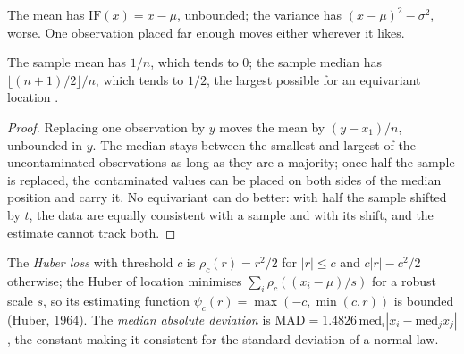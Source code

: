The mean has $\mathrm{IF}(x) = x - \mu$, unbounded; the variance has $(x - \mu)^2 - \sigma^2$, worse. One observation placed far enough
moves either wherever it likes.

\begin{proposition}\label{prop:qm:robust-statistics-and-heavy-tails:breakdown}
The sample mean has  $1/n$, which tends to 0; the sample median has  $\lfloor(n + 1)/2\rfloor/n$, which
tends to $1/2$, the largest possible for an equivariant location .
\end{proposition}

\begin{proof}
Replacing one observation by $y$ moves the mean by $(y - x_1)/n$, unbounded in $y$. The median stays between the smallest and largest of
the uncontaminated observations as long as they are a majority; once half the sample is replaced, the contaminated values can be placed
on both sides of the median position and carry it. No equivariant  can do better: with half the sample shifted by $t$, the data
are equally consistent with a sample and with its shift, and the estimate cannot track both.
\end{proof}

\begin{definition}\label{def:qm:robust-statistics-and-heavy-tails:huber}
The \emph{Huber loss} with threshold $c$ is $\rho_c(r) = r^2/2$ for $|r| \le c$ and $c|r| - c^2/2$ otherwise; the Huber
 of location minimises $\sum_i\rho_c((x_i - \mu)/s)$ for a robust scale $s$, so its estimating function $\psi_c(r) = \max(-c,
\min(c, r))$ is bounded (Huber, 1964). The \emph{median absolute deviation} is $\mathrm{MAD} =
1.4826\,\mathrm{med}_i|x_i - \mathrm{med}_jx_j|$, the constant making it consistent for the standard deviation of a normal law.
\end{definition}

